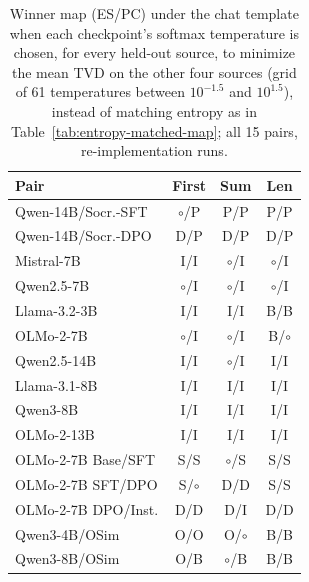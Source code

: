 \begin{table}[t]
\centering\scriptsize
\setlength{\tabcolsep}{3pt}
\begin{tabular}{@{}lccc@{}}
\toprule
Pair & First & Sum & Len \\
\midrule
Qwen-14B/Socr.-SFT & $\circ$/P & P/P & P/P \\
Qwen-14B/Socr.-DPO & D/P & D/P & D/P \\
Mistral-7B & I/I & $\circ$/I & $\circ$/I \\
Qwen2.5-7B & $\circ$/I & $\circ$/I & $\circ$/I \\
Llama-3.2-3B & I/I & I/I & B/B \\
OLMo-2-7B & $\circ$/I & $\circ$/I & B/$\circ$ \\
Qwen2.5-14B & I/I & $\circ$/I & I/I \\
Llama-3.1-8B & I/I & I/I & I/I \\
Qwen3-8B & I/I & I/I & I/I \\
OLMo-2-13B & I/I & I/I & I/I \\
OLMo-2-7B Base/SFT & S/S & $\circ$/S & S/S \\
OLMo-2-7B SFT/DPO & S/$\circ$ & D/D & S/S \\
OLMo-2-7B DPO/Inst. & D/D & D/I & D/D \\
Qwen3-4B/OSim & O/O & O/$\circ$ & B/B \\
Qwen3-8B/OSim & O/B & $\circ$/B & B/B \\
\bottomrule
\end{tabular}
\caption{Winner map (ES/PC) under the chat template when each checkpoint's softmax temperature is chosen, for every held-out source, to minimize the mean TVD on the other four sources (grid of 61 temperatures between $10^{-1.5}$ and $10^{1.5}$), instead of matching entropy as in Table~\ref{tab:entropy-matched-map}; all 15 pairs, re-implementation runs.}
\label{tab:tvd-opt-map}
\end{table}
